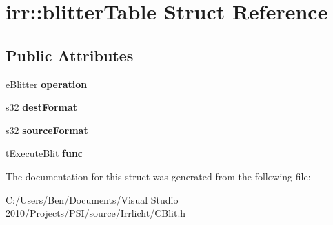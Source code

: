 \hypertarget{structirr_1_1blitter_table}{\section{irr\-:\-:blitter\-Table Struct Reference}
\label{structirr_1_1blitter_table}
}
\subsection*{Public Attributes}
\begin{DoxyCompactItemize}
\item 
\hypertarget{structirr_1_1blitter_table_a84eba17903b7c3f862c282f0a4ac6129}{e\-Blitter {\bfseries operation}}\label{structirr_1_1blitter_table_a84eba17903b7c3f862c282f0a4ac6129}

\item 
\hypertarget{structirr_1_1blitter_table_a7ec42abffadb026e6a8c2dc5f76cd69d}{s32 {\bfseries dest\-Format}}\label{structirr_1_1blitter_table_a7ec42abffadb026e6a8c2dc5f76cd69d}

\item 
\hypertarget{structirr_1_1blitter_table_a847fb4942484e6b4f32d8a99e3d332a0}{s32 {\bfseries source\-Format}}\label{structirr_1_1blitter_table_a847fb4942484e6b4f32d8a99e3d332a0}

\item 
\hypertarget{structirr_1_1blitter_table_a46e67bc5279b890e4a2fa26360f5666a}{t\-Execute\-Blit {\bfseries func}}\label{structirr_1_1blitter_table_a46e67bc5279b890e4a2fa26360f5666a}

\end{DoxyCompactItemize}


The documentation for this struct was generated from the following file\-:\begin{DoxyCompactItemize}
\item 
C\-:/\-Users/\-Ben/\-Documents/\-Visual Studio 2010/\-Projects/\-P\-S\-I/source/\-Irrlicht/C\-Blit.\-h\end{DoxyCompactItemize}
